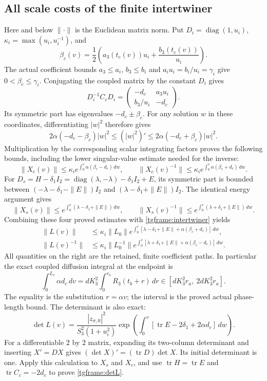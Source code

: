 \documentclass[11pt]{article}
\begin{document}
\subsection{All scale costs of the finite intertwiner}

Here and below $\|\cdot\|$ is the Euclidean matrix norm.
Put $D_i=\operatorname{diag}(1,u_i)$,
$\kappa_i=\max(u_i,u_i^{-1})$, and
\[
 \beta_c(v)=\frac12\left(a_3(t_c(v))u_i+
                                  \frac{b_3(t_c(v))}{u_i}\right).
\]
The actual coefficient bounds $a_3\le a_i$, $b_3\le b_i$ and
$a_iu_i=b_i/u_i=\gamma_i$ give $0<\beta_c\le\gamma_i$.
Conjugating the coupled matrix by the constant $D_i$ gives
\[
 D_i^{-1}C_cD_i=
 \begin{pmatrix}-d_c&a_3u_i\\b_3/u_i&-d_c\end{pmatrix}.
\]
Its symmetric part has eigenvalues $-d_c\pm\beta_c$.
For any solution $w$ in these coordinates, differentiating $|w|^2$
therefore gives
\[
 2\alpha(-d_c-\beta_c)|w|^2
 \le (|w|^2)'
 \le2\alpha(-d_c+\beta_c)|w|^2.
\]
Multiplication by the corresponding scalar integrating factors proves
the following bounds, including the lower singular-value estimate
needed for the inverse:
\[
 \|X_c(v)\|\le\kappa_i
       e^{\int_0^v\alpha(\beta_c-d_c)\,dw},\qquad
 \|X_c(v)^{-1}\|\le\kappa_i
       e^{\int_0^v\alpha(\beta_c+d_c)\,dw}.
\]
For $D_s=H-\delta_1I_2=
\operatorname{diag}(\lambda,-\lambda)-\delta_1I_2+E$,
its symmetric part is bounded between
$(-\lambda-\delta_1-\|E\|)I_2$ and
$(\lambda-\delta_1+\|E\|)I_2$. The identical energy argument gives
\[
 \|X_s(v)\|\le
 e^{\int_0^v(\lambda-\delta_1+\|E\|)\,dw},\qquad
 \|X_s(v)^{-1}\|\le
 e^{\int_0^v(\lambda+\delta_1+\|E\|)\,dw}.
\]
Combining these four proved estimates with \eqref{tgframe:intertwiner}
yields
\begin{align}
 \|L(v)\|&\le\kappa_i\|L_0\|
 e^{\int_0^v[\lambda-\delta_1+\|E\|
                       +\alpha(\beta_c+d_c)]\,dw},\nonumber\\
 \|L(v)^{-1}\|&\le\kappa_i\|L_0^{-1}\|
 e^{\int_0^v[\lambda+\delta_1+\|E\|
                       +\alpha(\beta_c-d_c)]\,dw}.
 \label{tgframe:intertwinernorms}
\end{align}
All quantities on the right are the retained, finite coefficient paths.
In particular the exact coupled diffusion integral at the endpoint is
\[
 \int_0^{L_s}\alpha d_c\,dv
 =dK_3^2\int_0^{r_a}R_3(t_b+r)\,dr
 \in[dK_3^2r_a,\ 2dK_3^2r_a].
\]
The equality is the substitution $r=\alpha v$; the interval is the
proved actual phase-length bound. The determinant is also exact:
\begin{equation}\label{tgframe:detL}
 \det L(v)=\frac{|z_{\sigma,0}|^2}{S_3^2(1+u_i^2)}
 \exp\left(\int_0^v[
        \operatorname{tr}E-2\delta_1+2\alpha d_c]\,dw\right).
\end{equation}
For a differentiable $2$ by $2$ matrix, expanding its two-column
determinant and inserting $X'=DX$ gives
$(\det X)'=(\operatorname{tr}D)\det X$. Its initial determinant
is one. Apply this calculation to $X_s$ and $X_c$, and use
$\operatorname{tr}H=\operatorname{tr}E$ and
$\operatorname{tr}C_c=-2d_c$ to prove \eqref{tgframe:detL}.
\end{document}
